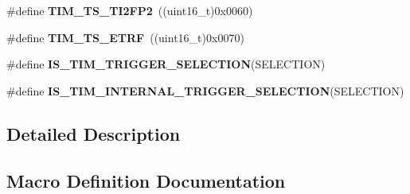 \begin{DoxyCompactItemize}
\item 
\hypertarget{group___t_i_m___internal___trigger___selection_ga0ed58a269bccd3f22d19cc9a2ba3123f}{}\#define {\bfseries T\+I\+M\+\_\+\+T\+S\+\_\+\+T\+I2\+F\+P2}~((uint16\+\_\+t)0x0060)\label{group___t_i_m___internal___trigger___selection_ga0ed58a269bccd3f22d19cc9a2ba3123f}

\item 
\hypertarget{group___t_i_m___internal___trigger___selection_gaece08e02e056613a882aa7ff0a6ccc2d}{}\#define {\bfseries T\+I\+M\+\_\+\+T\+S\+\_\+\+E\+T\+R\+F}~((uint16\+\_\+t)0x0070)\label{group___t_i_m___internal___trigger___selection_gaece08e02e056613a882aa7ff0a6ccc2d}

\item 
\#define {\bfseries I\+S\+\_\+\+T\+I\+M\+\_\+\+T\+R\+I\+G\+G\+E\+R\+\_\+\+S\+E\+L\+E\+C\+T\+I\+O\+N}(S\+E\+L\+E\+C\+T\+I\+O\+N)
\item 
\#define {\bfseries I\+S\+\_\+\+T\+I\+M\+\_\+\+I\+N\+T\+E\+R\+N\+A\+L\+\_\+\+T\+R\+I\+G\+G\+E\+R\+\_\+\+S\+E\+L\+E\+C\+T\+I\+O\+N}(S\+E\+L\+E\+C\+T\+I\+O\+N)
\end{DoxyCompactItemize}


\subsection{Detailed Description}


\subsection{Macro Definition Documentation}
\hypertarget{group___t_i_m___internal___trigger___selection_ga1ce6c387021e2fdaf3fa3d7cd3eae962}{}
